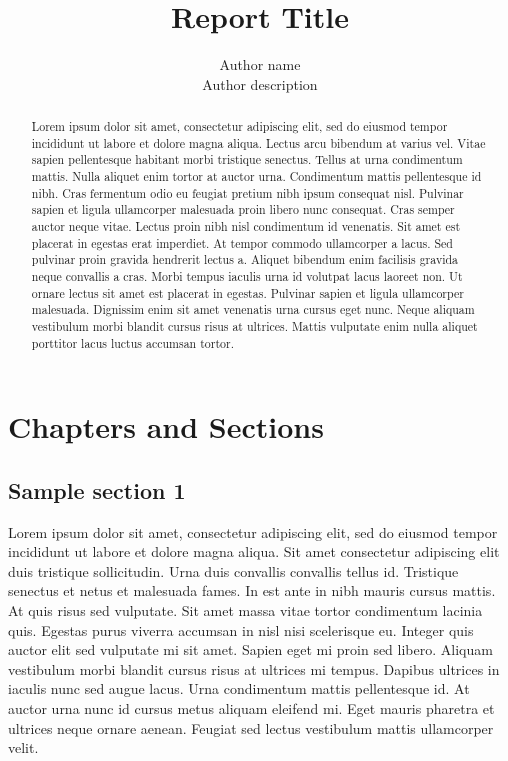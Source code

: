 \documentclass[a4paper, 12pt]{report}
\title{Report Title}
\author{Author name\\ Author description}
\begin{document}
\maketitle
\thispagestyle{empty}
\newpage

\begin{abstract}
Lorem ipsum dolor sit amet, consectetur adipiscing elit, sed do eiusmod tempor incididunt ut labore et dolore magna aliqua. Lectus arcu bibendum at varius vel. Vitae sapien pellentesque habitant morbi tristique senectus. Tellus at urna condimentum mattis. Nulla aliquet enim tortor at auctor urna. Condimentum mattis pellentesque id nibh. Cras fermentum odio eu feugiat pretium nibh ipsum consequat nisl. Pulvinar sapien et ligula ullamcorper malesuada proin libero nunc consequat. Cras semper auctor neque vitae. Lectus proin nibh nisl condimentum id venenatis. Sit amet est placerat in egestas erat imperdiet. At tempor commodo ullamcorper a lacus. Sed pulvinar proin gravida hendrerit lectus a. Aliquet bibendum enim facilisis gravida neque convallis a cras. Morbi tempus iaculis urna id volutpat lacus laoreet non. Ut ornare lectus sit amet est placerat in egestas. Pulvinar sapien et ligula ullamcorper malesuada. Dignissim enim sit amet venenatis urna cursus eget nunc. Neque aliquam vestibulum morbi blandit cursus risus at ultrices. Mattis vulputate enim nulla aliquet porttitor lacus luctus accumsan tortor.
\end{abstract}

\tableofcontents

\listoffigures

\listoftables

\newpage
\printglossary[type=\acronymtype]



\chapter{Chapters and Sections}
\section{Sample section 1}
Lorem ipsum dolor sit amet, consectetur adipiscing elit, sed do eiusmod tempor incididunt ut labore et dolore magna aliqua. Sit amet consectetur adipiscing elit duis tristique sollicitudin. Urna duis convallis convallis tellus id. Tristique senectus et netus et malesuada fames. In est ante in nibh mauris cursus mattis. At quis risus sed vulputate. Sit amet massa vitae tortor condimentum lacinia quis. Egestas purus viverra accumsan in nisl nisi scelerisque eu. Integer quis auctor elit sed vulputate mi sit amet. Sapien eget mi proin sed libero. Aliquam vestibulum morbi blandit cursus risus at ultrices mi tempus. Dapibus ultrices in iaculis nunc sed augue lacus. Urna condimentum mattis pellentesque id. At auctor urna nunc id cursus metus aliquam eleifend mi. Eget mauris pharetra et ultrices neque ornare aenean. Feugiat sed lectus vestibulum mattis ullamcorper velit.
\end{document}
